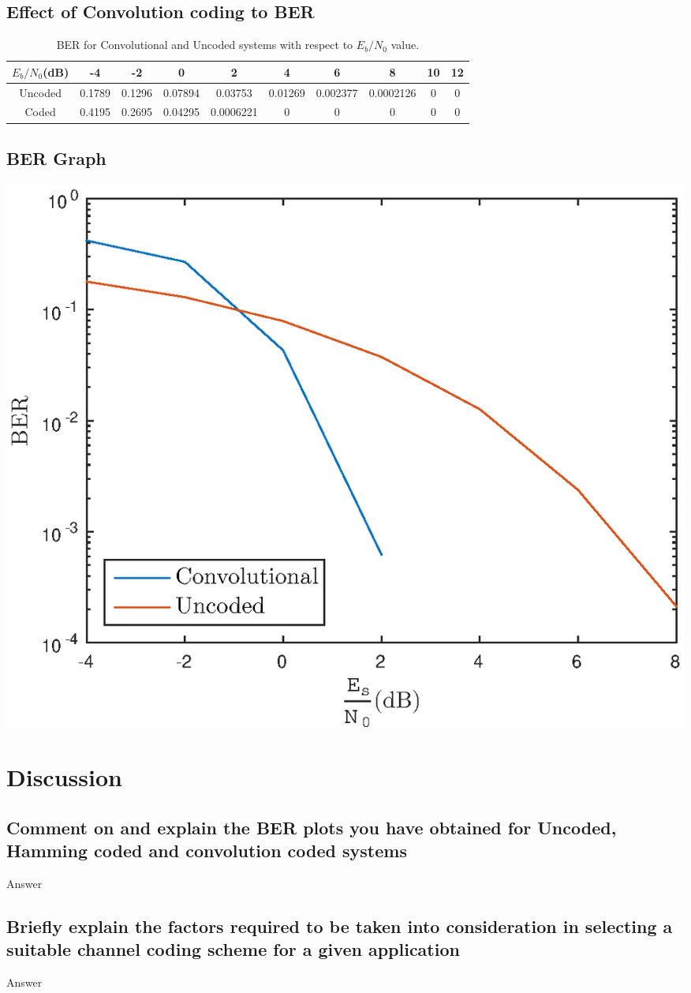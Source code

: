 \documentclass[11pt]{article}
\newcommand{\snr}{$E_{b}/N_{0}$}
\begin{document}
\subsection{Effect of Convolution coding to BER}
\begin{table}[h]
    \centering
    \caption{\label{tab:transmit_power_levels_sim}BER for Convolutional and Uncoded systems with respect to $E_{b}/N_{0}$ value.}
    \begin{tabular}{|c|c|c|c|c|c|c|c|c|c|}
        \hline
        \snr (dB) & -4       & -2       & 0         & 2         & 4       & 6        & 8         & 10 & 12 \\\hline
        Uncoded   & 0.1789   & 0.1296   & 0.07894   & 0.03753   & 0.01269 & 0.002377 & 0.0002126 & 0  & 0 \\\hline
        Coded     & 0.4195   & 0.2695   & 0.04295   & 0.0006221 & 0       & 0        & 0         & 0  & 0 \\\hline
    \end{tabular}
\end{table}

\subsection{BER Graph}
\begin{center}
    \includegraphics[width=.5\textwidth]{q613.eps}
    \label{fig:q613}
\end{center}


\section{Discussion}
\subsection{Comment on and explain the BER plots you have obtained for Uncoded, Hamming coded and
convolution coded systems}
Answer
\subsection{Briefly explain the factors required to be taken into consideration in selecting a suitable
channel coding scheme for a given application}
Answer


\end{document}
